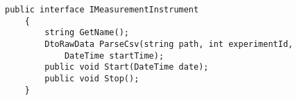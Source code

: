 \begin{lstlisting}[caption=The interface used to implement the measuring instruments, label={lst:measurement_instruments}]
    public interface IMeasurementInstrument
    {
        string GetName();
        DtoRawData ParseCsv(string path, int experimentId, 
            DateTime startTime);
        public void Start(DateTime date);
        public void Stop();
    }
\end{lstlisting}